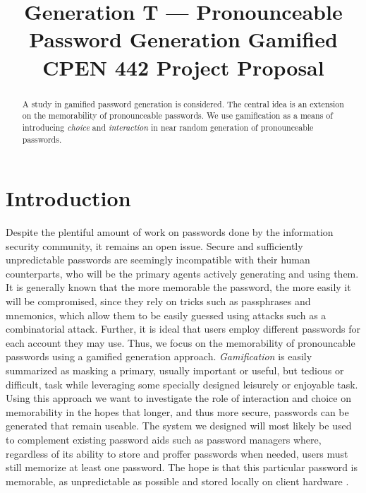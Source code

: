 \documentclass[conference]{IEEEtran}
\begin{document}
\title{Generation T --- Pronounceable Password Generation Gamified\\
CPEN 442 Project Proposal}


\author{
\and
{}
}


\maketitle

\begin{abstract}
A study in gamified password generation is considered. The central idea is an extension on the memorability of pronounceable passwords. We use gamification as a means of introducing \emph{choice} and \emph{interaction} in near random generation of pronounceable passwords.
\end{abstract}

\section{Introduction}
Despite the plentiful amount of work on passwords done by the information security community, it remains an open issue. Secure and sufficiently unpredictable passwords are seemingly incompatible with their human counterparts, who will be the primary agents actively generating and using them. It is generally known that the more memorable the password, the more easily it will be compromised, since they rely on tricks such as passphrases and mnemonics, which allow them to be easily guessed using attacks such as a combinatorial attack. Further, it is ideal that users employ different passwords for each account they may use. Thus, we focus on the memorability of pronouncable passwords using a gamified generation approach. \emph{Gamification} is easily summarized as masking a primary, usually important or useful, but tedious or difficult, task while leveraging some specially designed leisurely or enjoyable task. Using this approach we want to investigate the role of interaction and choice on memorability in the hopes that longer, and thus more secure, passwords can be generated that remain useable. The system we designed will most likely be used to complement existing password aids such as password managers where, regardless of its ability to store and proffer passwords when needed, users must still memorize at least one password. The hope is that this particular password is memorable, as unpredictable as possible and stored locally on client hardware 
.
\end{document}
